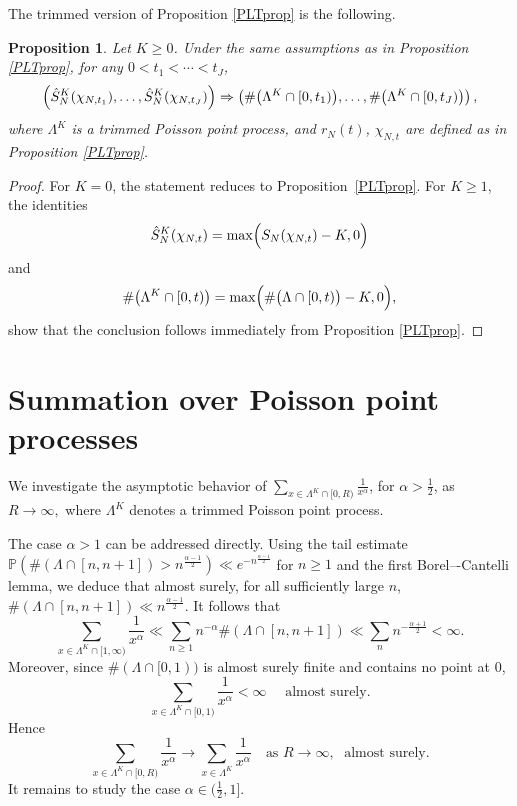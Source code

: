 \documentclass[11pt,twoside,a4paper,reqno]{amsart}
\newtheorem{proposition}[theorem]{Proposition}
\newcommand{\as}[1]{\text{as } #1 \rightarrow\infty}
\begin{document}
The trimmed version of Proposition \ref{PLTprop} is the following.


\begin{proposition}\label{trimPLTpropF}
Let $K\geq 0$. Under the same assumptions as in Proposition \ref{PLTprop}, for any $0<t_1<\cdots<t_J$,
$$
\Bigl(\hat{S}_N^K(\chi_{N,t_1}), \ldots, \hat{S}_N^K(\chi_{N,t_J})\Bigr)
\Rightarrow \left(\#\bigl(\Lambda^K \cap [0,t_1)\bigr), \ldots, \#\bigl(\Lambda^K \cap [0,t_J)\bigr)\right),
$$
where $\Lambda^K$ is a trimmed Poisson point process, and $r_N(t)$, $\chi_{N,t}$ are defined as in Proposition \ref{PLTprop}.
\end{proposition}


\begin{proof}
For $K=0$, the statement reduces to Proposition~\ref{PLTprop}. For $K\ge1$, the identities
$$
\hat{S}_N^K(\chi_{N,t}) = \max\Bigl(S_N(\chi_{N,t}) - K, 0\Bigr)
$$
and
$$
\#\bigl(\Lambda^K \cap [0,t)\bigr) = \max\Bigl(\#\bigl(\Lambda \cap [0,t)\bigr) - K, 0\Bigr),
$$
show that the conclusion follows immediately from Proposition \ref{PLTprop}.
\end{proof}



\section{Summation over Poisson point processes}\label{SumPP}

We investigate the asymptotic behavior of $\sum_{x\in \Lambda^K \cap [0,R)} \frac{1}{x^{\alpha}}$, for $\alpha> \frac{1}{2}$, as $R\rightarrow \infty,$ where $\Lambda^K$ denotes a trimmed Poisson point process.

The case $\alpha > 1$ can be addressed directly.
Using the tail estimate $\mathbb{P}(\#(\Lambda \cap [n,n+1]) > n^{\frac{\alpha-1}{2}}) \ll e^{-n^{\frac{\alpha-1}{2}}}$ for $n\geq1$ and the first Borel–-Cantelli lemma, we deduce that almost surely, for all sufficiently large $n$,
$
\#(\Lambda \cap [n,n+1]) \ll n^{\frac{\alpha-1}{2}}.
$
It follows that
$$\sum_{x\in \Lambda^K\cap[1,\infty)}\frac{1}{x^{\alpha}}\ll
\sum_{n\ge1} n^{-\alpha}\#(\Lambda\cap[n,n+1])\ll\sum_n n^{-\frac{\alpha+1}{2}}<\infty.$$
Moreover, since $\#(\Lambda\cap[0,1))$ is almost surely finite and contains no point at $0$,
$$
\sum_{x\in \Lambda^K\cap[0,1)}\frac1{x^\alpha}<\infty
\quad\text{ almost surely}.
$$
Hence
\begin{equation}\label{PPPcon>1}
\sum_{x\in \Lambda^K \cap [0,R)} \frac{1}{x^{\alpha}} \rightarrow \sum_{x\in \Lambda^K} \frac{1}{x^{\alpha}} \quad \as{R}, \; \text{ almost surely}.
\end{equation}
It remains to study the case $\alpha\in (\frac{1}{2},1]$.
\end{document}
